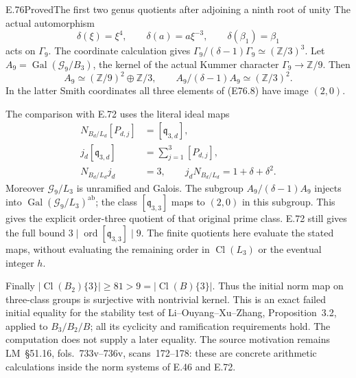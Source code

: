 \begin{statement}{E.76}{Proved}{The first two genus quotients after adjoining a ninth root of unity}
The actual automorphism
\[
 \delta(\xi)=\xi^4,\qquad\delta(a)=a\xi^{-3},
 \qquad\delta(\beta_1)=\beta_1
 \tag{E76.9}
\]
acts on $\Gamma_9$. The coordinate calculation gives
$\Gamma_9/(\delta-1)\Gamma_9\simeq(\mathbb Z/3)^3$.
Let $A_9=\operatorname{Gal}(\mathcal G_9/B_3)$, the kernel
of the actual Kummer character $\Gamma_9\to\mathbb Z/9$.
Then
\[
 A_9\simeq(\mathbb Z/9)^2\oplus\mathbb Z/3,
 \qquad A_9/(\delta-1)A_9\simeq(\mathbb Z/3)^2.
 \tag{E76.10}
\]
In the latter Smith coordinates all three elements of
(E76.8) have image $(2,0)$.

The comparison with E.72 uses the literal ideal maps
\[
 \begin{split}
 N_{B_d/L_d}[P_{d,j}]&=[\mathfrak q_{3,d}],\\
 j_d[\mathfrak q_{3,d}]&=\sum_{j=1}^3[P_{d,j}],\\
 N_{B_d/L_d}j_d&=3,\qquad
 j_dN_{B_d/L_d}=1+\delta+\delta^2 .
 \end{split}
 \tag{E76.11}
\]
Moreover $\mathcal G_9/L_3$ is unramified and Galois.
The subgroup $A_9/(\delta-1)A_9$ injects into
$\operatorname{Gal}(\mathcal G_9/L_3)^{\mathrm{ab}}$;
the class $[\mathfrak q_{3,3}]$ maps to $(2,0)$ in this
subgroup. This gives the explicit order-three quotient of
that original prime class. E.72 still gives the full bound
$3\mid\operatorname{ord}[\mathfrak q_{3,3}]\mid9$.
The finite quotients here evaluate the stated maps, without
evaluating the remaining order in $\operatorname{Cl}(L_3)$
or the eventual integer $h$.

Finally $|\operatorname{Cl}(B_2)\{3\}|\ge81>9
=|\operatorname{Cl}(B)\{3\}|$. Thus the initial norm map
on three-class groups is surjective with nontrivial kernel.
This is an exact failed initial equality for the stability
test of Li--Ouyang--Xu--Zhang, Proposition~3.2, applied to
$B_3/B_2/B$; all its cyclicity and ramification requirements
hold. The computation does not supply a later equality.
The source motivation remains LM~\S51.16,
fols.~733v--736v, scans~172--178: these are concrete
arithmetic calculations inside the norm systems of
E.46 and E.72.
\end{statement}

